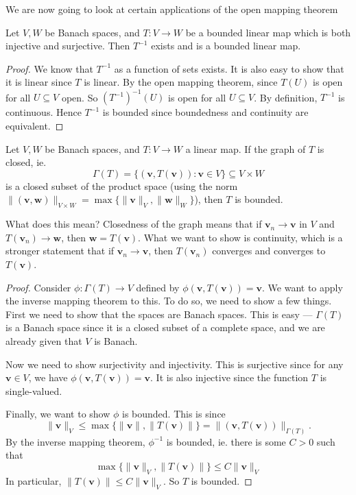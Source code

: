 \documentclass[a4paper]{article}
\begin{document}
We are now going to look at certain applications of the open mapping theorem
\begin{thm}
  Let $V, W$ be Banach spaces, and $T: V\to W$ be a bounded linear map which is both injective and surjective. Then $T^{-1}$ exists and is a bounded linear map.
\end{thm}

\begin{proof}
  We know that $T^{-1}$ as a function of sets exists. It is also easy to show that it is linear since $T$ is linear. By the open mapping theorem, since $T(U)$ is open for all $U \subseteq V$ open. So $(T^{-1})^{-1}(U)$ is open for all $U\subseteq V$. By definition, $T^{-1}$ is continuous. Hence $T^{-1}$ is bounded since boundedness and continuity are equivalent.
\end{proof}

\begin{thm}
  Let $V, W$ be Banach spaces, and $T: V\to W$ a linear map. If the graph of $T$ is closed, ie.
  \[
    \Gamma(T) = \{(\mathbf{v}, T(\mathbf{v})): \mathbf{v}\in V\} \subseteq V\times W
  \]
  is a closed subset of the product space (using the norm $\|(\mathbf{v}, \mathbf{w})\|_{V\times W} = \max \{\|\mathbf{v}\|_V, \|\mathbf{w}\|_W\}$), then $T$ is bounded.
\end{thm}
What does this mean? Closedness of the graph means that if $\mathbf{v}_n \to \mathbf{v}$ in $V$ and $T (\mathbf{v}_n) \to \mathbf{w}$, then $\mathbf{w} = T(\mathbf{v})$. What we want to show is continuity, which is a stronger statement that if $\mathbf{v}_n \to \mathbf{v}$, then $T(\mathbf{v}_n)$ converges and converges to $T(\mathbf{v})$.

\begin{proof}
  Consider $\phi: \Gamma(T) \to V$ defined by $\phi(\mathbf{v}, T(\mathbf{v})) = \mathbf{v}$. We want to apply the inverse mapping theorem to this. To do so, we need to show a few things. First we need to show that the spaces are Banach spaces. This is easy --- $\Gamma(T)$ is a Banach space since it is a closed subset of a complete space, and we are already given that $V$ is Banach.

  Now we need to show surjectivity and injectivity. This is surjective since for any $\mathbf{v}\in V$, we have $\phi(\mathbf{v}, T(\mathbf{v})) = \mathbf{v}$. It is also injective since the function $T$ is single-valued.

  Finally, we want to show $\phi$ is bounded. This is since
  \[
    \|\mathbf{v}\|_V \leq \max\{\|\mathbf{v}\|, \|T(\mathbf{v})\|\} = \|(\mathbf{v}, T(\mathbf{v}))\|_{\Gamma(T)}.
  \]
  By the inverse mapping theorem, $\phi^{-1}$ is bounded, ie. there is some $C > 0$ such that
  \[
    \max\{\|\mathbf{v}\|_V, \|T(\mathbf{v})\|\} \leq C\|\mathbf{v}\|_V
  \]
  In particular, $\|T(\mathbf{v})\| \leq C\|\mathbf{v}\|_V$. So $T$ is bounded.
\end{proof}
\end{document}
